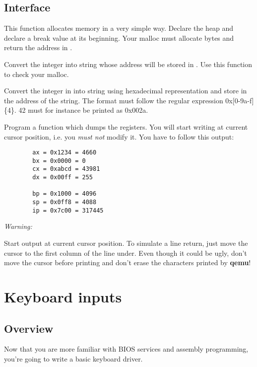 \subsection*{Interface}
{
  This function allocates memory in a very simple way. Declare the heap and
  declare a break value at its beginning.
  Your malloc must allocate  bytes and return the address
  in .
}

{
  Convert the integer  into string whose address will be
  stored in . Use this function to check your malloc.
}

{
  Convert the integer in  into string using hexadecimal
  representation and store in  the address of the string.
  The format must follow the regular expression 0x[0-9a-f]\{4\}.
  42 must for instance be printed as 0x002a.
}

{
  Program a function which dumps the registers. You will start writing
  at current cursor position, i.e. you \emph{must not} modify it. You have to
  follow this output:
}
\begin{verbatim}
        ax = 0x1234 = 4660
        bx = 0x0000 = 0
        cx = 0xabcd = 43981
        dx = 0x00ff = 255

        bp = 0x1000 = 4096
        sp = 0x0ff8 = 4088
        ip = 0x7c00 = 317445
\end{verbatim}

\function{}{}
{
  {\em Warning:}

  Start output at current cursor position. To simulate a line return, just move
  the cursor to the first column of the line under. Even though it could be
  ugly, don't move the cursor before printing and don't erase the characters
  printed by \textbf{qemu}!
}

%
%

\newpage

\section{Keyboard inputs}

\subsection*{Overview}
Now that you are more familiar with BIOS services and assembly programming,
you're going to write a basic keyboard driver.

